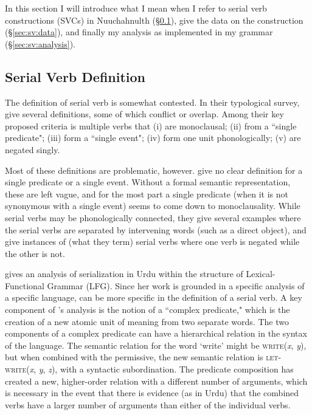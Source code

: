 In this section I will introduce what I mean when I refer to serial verb constructions (SVCs) in Nuuchahnulth (\S\ref{sec:sv:def}), give the data on the construction (\S\ref{sec:sv:data}), and finally my analysis as implemented in my grammar (\S\ref{sec:sv:analysis}).

\subsection{Serial Verb Definition} \label{sec:sv:def}

The definition of serial verb is somewhat contested. In their typological survey, \cite{aikhenvalddixon2006} give several definitions, some of which conflict or overlap. Among their key proposed criteria is multiple verbs that (i) are monoclausal; (ii) from a ``single predicate"; (iii) form a ``single event"; (iv) form one unit phonologically; (v) are negated singly.

Most of these definitions are problematic, however. \citeauthor{aikhenvalddixon2006} give no clear definition for a single predicate or a single event. Without a formal semantic representation, these are left vague, and for the most part a single predicate (when it is not synonymous with a single event) seems to come down to monoclausality. While serial verbs may be phonologically connected, they give several examples where the serial verbs are separated by intervening words (such as a direct object), and give instances of (what they term) serial verbs where one verb is negated while the other is not.

\cite{butt1995} gives an analysis of serialization in Urdu within the structure of Lexical-Functional Grammar (LFG). Since her work is grounded in a specific analysis of a specific language, \citeauthor{butt1995} can be more specific in the definition of a serial verb. A key component of \citeauthor{butt1995}'s analysis is the notion of a ``complex predicate," which is the creation of a new atomic unit of meaning from two separate words. The two components of a complex predicate can have a hierarchical relation in the syntax of the language. The semantic relation for the word `write' might be \textsc{write}(\textit{x}, \textit{y}), but when combined with the permissive, the new semantic relation is \textsc{let-write}(\textit{x}, \textit{y}, \textit{z}), with a syntactic subordination. The predicate composition has created a new, higher-order relation with a different number of arguments, which is necessary in the event that there is evidence (as in Urdu) that the combined verbs have a larger number of arguments than either of the individual verbs.

